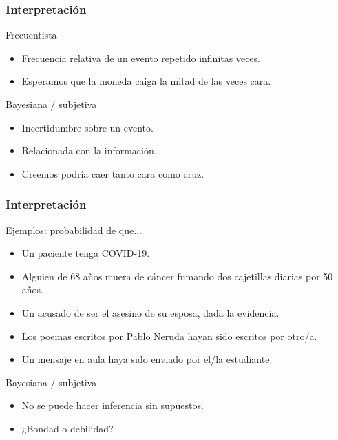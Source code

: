 \documentclass[table]{beamer}
\begin{document}
\begin{frame}
    \frametitle{Interpretación}
    \begin{block}{Frecuentista}
        \begin{itemize}
            \item Frecuencia relativa de un evento repetido infinitas veces.
            \item Esperamos que la moneda caiga la mitad de las veces cara.
        \end{itemize}
    \end{block}
    \begin{block}{Bayesiana / subjetiva}
        \begin{itemize}
            \item Incertidumbre sobre un evento.
            \item Relacionada con la información.
            \item Creemos podría caer tanto cara como cruz.
        \end{itemize}
    \end{block}
\end{frame}

\begin{frame}
    \frametitle{Interpretación}
    \begin{block}{Ejemplos: probabilidad de que...}
        \begin{itemize}
            \item Un paciente tenga COVID-19.
            \item Alguien de 68 años muera de cáncer fumando dos cajetillas diarias por 50 años.
            \item Un acusado de ser el asesino de su esposa, dada la evidencia.
            \item Los poemas escritos por Pablo Neruda hayan sido escritos por otro/a.
            \item Un mensaje en aula haya sido enviado por el/la estudiante.
        \end{itemize}
    \end{block}
    \begin{block}{Bayesiana / subjetiva}
        \begin{itemize}
            \item No se puede hacer inferencia sin supuestos.
            \item ¿Bondad o debilidad?
        \end{itemize}
    \end{block}
\end{frame}
\end{document}
